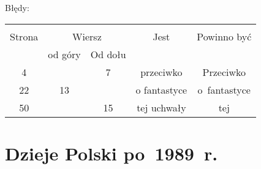 \documentclass[a4paper,11pt]{article}
\begin{document}
Błędy:\\
\begin{center}
  \begin{tabular}{|c|c|c|c|c|}
    \hline
    & \multicolumn{2}{c|}{} & & \\
    Strona & \multicolumn{2}{c|}{Wiersz} & Jest
                              & Powinno być \\ \cline{2-3}
    & od góry & Od dołu & & \\
    \hline
    4   & &  7 & przeciwko & Przeciwko \\
    22  & 13 & & o\ld{} fantastyce & o~fantastyce \\ %
    50  & & 15 & tej uchwały & tej \\
    \hline
  \end{tabular}
\end{center}

\vspace{\spaceTwo}









\section{Dzieje Polski po~1989~r.}

\vspace{\spaceTwo}





\end{document}
